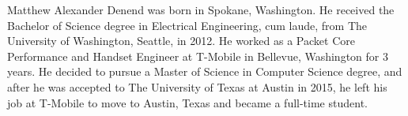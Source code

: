\documentclass[12pt]{report}	%
\begin{document}
\nocite{*}      %





\begin{vita}
Matthew Alexander Denend was born in Spokane, Washington. He received the Bachelor of Science degree in Electrical Engineering, cum laude, from The University of Washington, Seattle, in 2012. He worked as a Packet Core Performance and Handset Engineer at T-Mobile in Bellevue, Washington for 3 years. He decided to pursue a Master of Science in Computer Science degree, and after he was accepted to The University of Texas at Austin in 2015, he left his job at T-Mobile to move to Austin, Texas and became a full-time student.
\end{vita}
\end{document}
